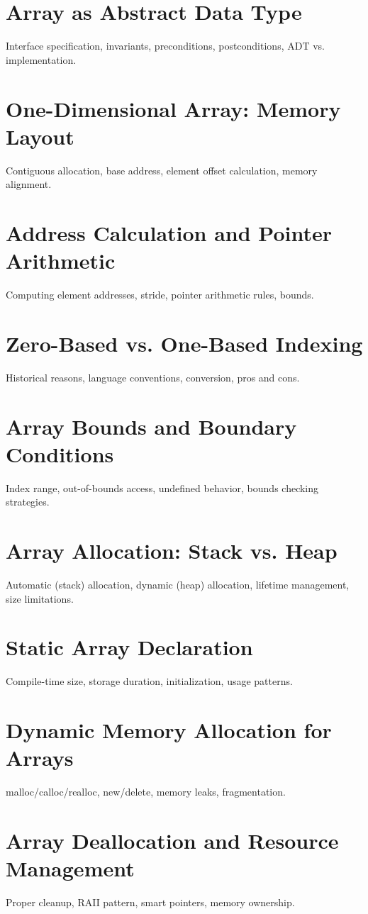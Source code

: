\chapter{Array as Abstract Data Type}
Interface specification, invariants, preconditions, postconditions, ADT vs. implementation.

\chapter{One-Dimensional Array: Memory Layout}
Contiguous allocation, base address, element offset calculation, memory alignment.

\chapter{Address Calculation and Pointer Arithmetic}
Computing element addresses, stride, pointer arithmetic rules, bounds.

\chapter{Zero-Based vs. One-Based Indexing}
Historical reasons, language conventions, conversion, pros and cons.

\chapter{Array Bounds and Boundary Conditions}
Index range, out-of-bounds access, undefined behavior, bounds checking strategies.

\chapter{Array Allocation: Stack vs. Heap}
Automatic (stack) allocation, dynamic (heap) allocation, lifetime management, size limitations.

\chapter{Static Array Declaration}
Compile-time size, storage duration, initialization, usage patterns.

\chapter{Dynamic Memory Allocation for Arrays}
malloc/calloc/realloc, new/delete, memory leaks, fragmentation.

\chapter{Array Deallocation and Resource Management}
Proper cleanup, RAII pattern, smart pointers, memory ownership.


